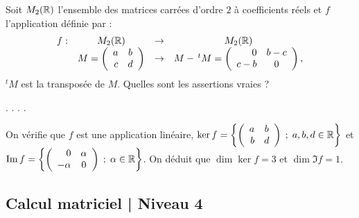 \begin{question}
Soit $ M_2(\mathbb{R})$ l'ensemble des matrices carrées d'ordre $2$ à coefficients réels et 
$f$ l'application  définie par :
$$\begin{array}{rccc}f:&M_2(\mathbb{R})&\to& M_2(\mathbb{R})\\
& M = \left(\begin{array}{rc}
a&b\\c&d\\ \end{array}\right) &\to &M- \, ^t M = 
\left(\begin{array}{rc}0&b-c\\c-b&0\\ 
\end{array}\right),  \end{array}$$
$^tM$ est la transposée de $M$. Quelles sont les assertions vraies ?
\begin{answers}  
.
.
.
.
\end{answers}
\begin{explanations} On vérifie que $f$ est une application linéaire, $\ker f=\left\{ \left(\begin{array}{rc}
a&b\\b&d\\ \end{array}\right) \; ; \; a,b,d \in \mathbb{R} \right \}$ et  
$\mathop{\mathrm{Im}}\nolimits f = \left\{ \left(\begin{array}{rc}0&\alpha\\-\alpha&0\\ 
\end{array}\right) \; ; \; \alpha \in \mathbb{R}  \right \}$. On  déduit que  $\dim \ker f=3$ et $\dim \Im f = 1$.
\end{explanations}
\end{question}

\subsection{Calcul matriciel | Niveau 4}

